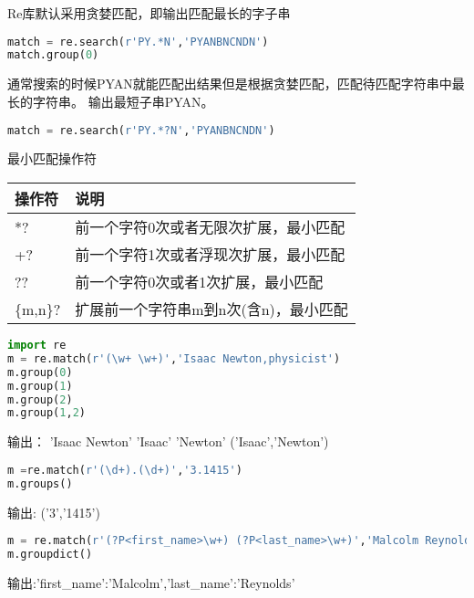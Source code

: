 \documentclass{book}
\begin{document}
Re库默认采用贪婪匹配，即输出匹配最长的字子串
\begin{lstlisting}[language=Python]
match = re.search(r'PY.*N','PYANBNCNDN')
match.group(0)
\end{lstlisting}
通常搜索的时候PYAN就能匹配出结果但是根据贪婪匹配，匹配待匹配字符串中最长的字符串。
输出最短子串PYAN。
\begin{lstlisting}[language=Python]
match = re.search(r'PY.*?N','PYANBNCNDN')
\end{lstlisting}
最小匹配操作符\newline
\begin{tabular}{|l|l|}
\hline
操作符&说明\\
\hline
*?&前一个字符0次或者无限次扩展，最小匹配\\
\hline
+?&前一个字符1次或者浮现次扩展，最小匹配\\
\hline
??&前一个字符0次或者1次扩展，最小匹配\\
\hline
\{m,n\}?&扩展前一个字符串m到n次(含n)，最小匹配\\
\hline
\end{tabular}
\begin{lstlisting}[language=Python]
import re
m = re.match(r'(\w+ \w+)','Isaac Newton,physicist')
m.group(0)
m.group(1)
m.group(2)
m.group(1,2)
\end{lstlisting}
输出：\newline
'Isaac Newton'\newline
'Isaac' \newline
'Newton'\newline
('Isaac','Newton')\newline
\begin{lstlisting}[language=Python]
m =re.match(r'(\d+).(\d+)','3.1415')
m.groups()
\end{lstlisting}
输出:\newline
('3','1415')\newline
\begin{lstlisting}[language=Python]
m = re.match(r'(?P<first_name>\w+) (?P<last_name>\w+)','Malcolm Reynolds')
m.groupdict()
\end{lstlisting}
输出:{'first\_name':'Malcolm','last\_name':'Reynolds'}\newline
\end{document}
